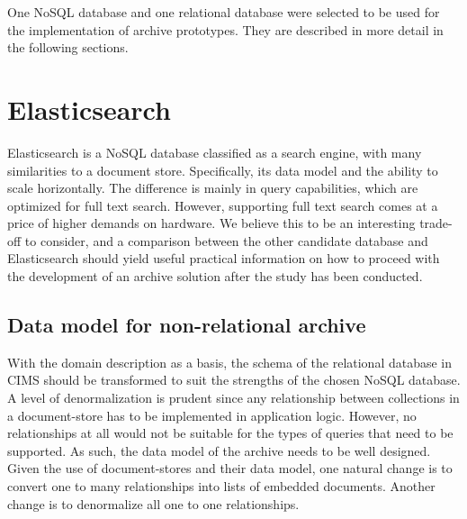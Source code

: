 One NoSQL database and one relational database were selected to be used for the implementation of archive prototypes. They are described in more detail in the following sections.


\section{Elasticsearch}
Elasticsearch \cite{elastic} is a NoSQL database classified as a search engine, with many similarities to a document store. Specifically, its data model and the ability to scale horizontally. The difference is mainly in query capabilities, which are optimized for full text search. However, supporting full text search comes at a price of higher demands on hardware. We believe this to be an interesting trade-off to consider, and a comparison between the other candidate database and Elasticsearch should yield useful practical information on how to proceed with the development of an archive solution after the study has been conducted.

\subsection{Data model for non-relational archive} \label{nosqlmodel}
With the domain description as a basis, the schema of the relational database in CIMS should be transformed to suit the strengths of the chosen NoSQL database. A level of denormalization is prudent since any relationship between collections in a document-store has to be implemented in application logic. However, no relationships at all would not be suitable for the types of queries that need to be supported. As such, the data model of the archive needs to be well designed. Given the use of document-stores and their data model, one natural change is to convert one to many relationships into lists of embedded documents. Another change is to denormalize all one to one relationships.

